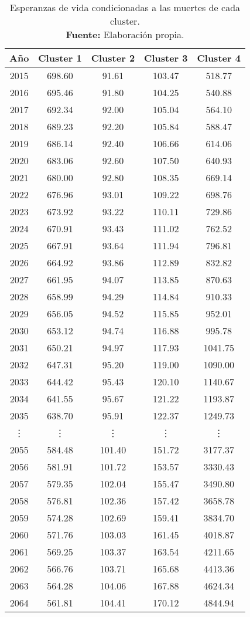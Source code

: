 \documentclass{article}
\begin{document}
\begin{table}[H]
\centering
   \label{espclust}
\begin{tabular}{c|cccc}
Año & Cluster 1 & Cluster 2 & Cluster 3 & Cluster 4 \\ 
  \hline
2015 & 698.60 & 91.61 & 103.47 & 518.77 \\ 
  2016 & 695.46 & 91.80 & 104.25 & 540.88 \\ 
  2017 & 692.34 & 92.00 & 105.04 & 564.10 \\ 
  2018 & 689.23 & 92.20 & 105.84 & 588.47 \\ 
  2019 & 686.14 & 92.40 & 106.66 & 614.06 \\ 
  2020 & 683.06 & 92.60 & 107.50 & 640.93 \\ 
  2021 & 680.00 & 92.80 & 108.35 & 669.14 \\ 
  2022 & 676.96 & 93.01 & 109.22 & 698.76 \\ 
  2023 & 673.92 & 93.22 & 110.11 & 729.86 \\ 
  2024 & 670.91 & 93.43 & 111.02 & 762.52 \\ 
  2025 & 667.91 & 93.64 & 111.94 & 796.81 \\ 
  2026 & 664.92 & 93.86 & 112.89 & 832.82 \\ 
  2027 & 661.95 & 94.07 & 113.85 & 870.63 \\ 
  2028 & 658.99 & 94.29 & 114.84 & 910.33 \\ 
  2029 & 656.05 & 94.52 & 115.85 & 952.01 \\ 
  2030 & 653.12 & 94.74 & 116.88 & 995.78 \\ 
  2031 & 650.21 & 94.97 & 117.93 & 1041.75 \\ 
  2032 & 647.31 & 95.20 & 119.00 & 1090.00 \\ 
  2033 & 644.42 & 95.43 & 120.10 & 1140.67 \\ 
  2034 & 641.55 & 95.67 & 121.22 & 1193.87 \\ 
  2035 & 638.70 & 95.91 & 122.37 & 1249.73 \\ 
\vdots &\vdots &\vdots &\vdots &\vdots \\
  2055 & 584.48 & 101.40 & 151.72 & 3177.37 \\ 
  2056 & 581.91 & 101.72 & 153.57 & 3330.43 \\ 
  2057 & 579.35 & 102.04 & 155.47 & 3490.80 \\ 
  2058 & 576.81 & 102.36 & 157.42 & 3658.78 \\ 
  2059 & 574.28 & 102.69 & 159.41 & 3834.70 \\ 
  2060 & 571.76 & 103.03 & 161.45 & 4018.87 \\ 
  2061 & 569.25 & 103.37 & 163.54 & 4211.65 \\ 
  2062 & 566.76 & 103.71 & 165.68 & 4413.36 \\ 
  2063 & 564.28 & 104.06 & 167.88 & 4624.34 \\ 
  2064 & 561.81 & 104.41 & 170.12 & 4844.94 \\ 
\end{tabular}
\caption{\centering Esperanzas de vida condicionadas a las muertes de cada cluster. \\ \textbf{Fuente:} Elaboración propia.}
\label{tablaesper}
\end{table}
\end{document}
